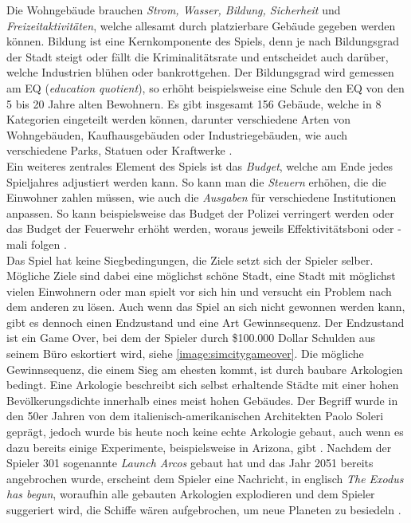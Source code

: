 Die Wohngebäude brauchen \textit{Strom, Wasser, Bildung, Sicherheit} und \textit{Freizeitaktivitäten}, welche allesamt durch platzierbare Gebäude gegeben werden können. Bildung ist eine Kernkomponente des Spiels, denn je nach Bildungsgrad der Stadt steigt oder fällt die Kriminalitätsrate und entscheidet auch darüber, welche Industrien blühen oder bankrottgehen. Der Bildungsgrad wird gemessen am EQ (\textit{education quotient}), so erhöht beispielsweise eine Schule den EQ von den 5 bis 20 Jahre alten Bewohnern. Es gibt insgesamt 156 Gebäude, welche in 8 Kategorien eingeteilt werden können, darunter verschiedene Arten von Wohngebäuden, Kaufhausgebäuden oder Industriegebäuden, wie auch verschiedene Parks, Statuen oder Kraftwerke \cite*[]{simcity:fandom}. \\
Ein weiteres zentrales Element des Spiels ist das \textit{Budget}, welche am Ende jedes Spieljahres adjustiert werden kann. So kann man die \textit{Steuern} erhöhen, die die Einwohner zahlen müssen, wie auch die \textit{Ausgaben} für verschiedene Institutionen anpassen. So kann beispielsweise das Budget der Polizei verringert werden oder das Budget der Feuerwehr erhöht werden, woraus jeweils Effektivitätsboni oder -mali folgen \cite*[]{simcity:video}. \\
Das Spiel hat keine Siegbedingungen, die Ziele setzt sich der Spieler selber. Mögliche Ziele sind dabei eine möglichst schöne Stadt, eine Stadt mit möglichst vielen Einwohnern oder man spielt vor sich hin und versucht ein Problem nach dem anderen zu lösen. Auch wenn das Spiel an sich nicht gewonnen werden kann, gibt es dennoch einen Endzustand und eine Art Gewinnsequenz. Der Endzustand ist ein Game Over, bei dem der Spieler durch \$100.000 Dollar Schulden aus \glqq seinem Büro eskortiert wird\grqq, siehe \autoref{image:simcitygameover}. Die mögliche Gewinnsequenz, die einem Sieg am ehesten kommt, ist durch baubare Arkologien bedingt. Eine Arkologie beschreibt sich selbst erhaltende Städte mit einer hohen Bevölkerungsdichte innerhalb eines meist hohen Gebäudes. Der Begriff wurde in den 50er Jahren von dem italienisch-amerikanischen Architekten Paolo Soleri geprägt, jedoch wurde bis heute noch keine echte Arkologie gebaut, auch wenn es dazu bereits einige Experimente, beispielsweise in Arizona, gibt \cite*[]{misc:arcology}. Nachdem der Spieler 301 sogenannte \textit{Launch Arcos} gebaut hat und das Jahr 2051 bereits angebrochen wurde, erscheint dem Spieler eine Nachricht, in englisch \textit{\glqq The Exodus has begun\grqq}, woraufhin alle gebauten Arkologien explodieren und dem Spieler suggeriert wird, die Schiffe wären aufgebrochen, um neue Planeten zu besiedeln \cite*[]{simcity:arcology}. \\
